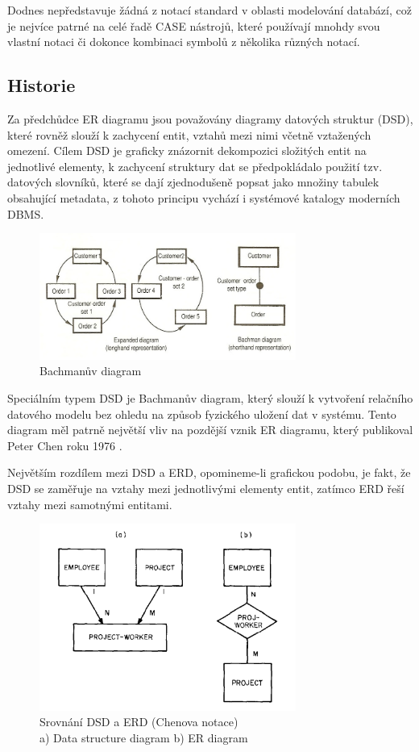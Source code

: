 \documentclass[czech,bachelor,public,dept460,male,oneside]{diploma}
\begin{document}
Dodnes nepředstavuje žádná z notací standard v oblasti modelování databází, což je nejvíce patrné na celé řadě CASE nástrojů, které používají mnohdy svou vlastní notaci či dokonce kombinaci symbolů z několika různých notací.

	\subsection{Historie}
	Za předchůdce ER diagramu jsou považovány diagramy datových struktur (DSD), které rovněž slouží k zachycení entit, vztahů mezi nimi včetně vztažených omezení. Cílem DSD je graficky znázornit dekompozici složitých entit na jednotlivé elementy, k zachycení struktury dat se předpokládalo použití tzv. datových slovníků, které se dají zjednodušeně popsat jako množiny tabulek obsahující metadata, z tohoto principu vychází i systémové katalogy moderních DBMS.
	
	\begin{figure}[!h]
		\centering
		\includegraphics[width=0.75\textwidth]{Figures/BachmanDiagram}
		\caption{Bachmanův diagram}
	\end{figure}
	
	Speciálním typem DSD je Bachmanův diagram, který slouží k vytvoření relačního datového modelu bez ohledu na způsob fyzického uložení dat v systému. Tento diagram měl patrně největší vliv na pozdější vznik ER diagramu, který publikoval Peter Chen roku 1976 \cite{chenERD}.
	
	Největším rozdílem mezi DSD a ERD, opomineme-li grafickou podobu, je fakt, že DSD se zaměřuje na vztahy mezi jednotlivými elementy entit, zatímco ERD řeší vztahy mezi samotnými entitami.
	
	\begin{figure}[!h]
		\centering
		\includegraphics[width=0.75\textwidth]{Figures/ChenVsDSD}
		\caption{Srovnání DSD a ERD (Chenova notace) \\ a) Data structure diagram b) ER diagram}
	\end{figure}
	
\end{document}
